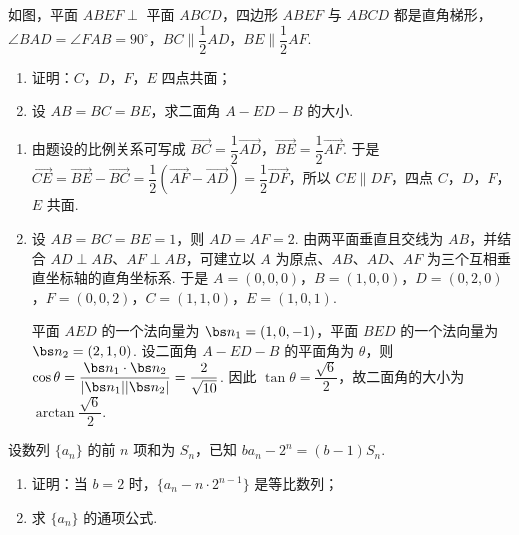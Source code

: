 \begin{problem}
如图，平面 \(ABEF\perp\) 平面 \(ABCD\)，四边形 \(ABEF\) 与 \(ABCD\) 都是直角梯形，\(\angle BAD=\angle FAB=90^{\circ}\)，\(BC\parallel\dfrac12AD\)，\(BE\parallel\dfrac12AF\).

\begin{enumerate}
\item 证明：\(C\)，\(D\)，\(F\)，\(E\) 四点共面；
\item 设 \(AB=BC=BE\)，求二面角 \(A-ED-B\) 的大小.
\end{enumerate}

\begin{center}
\end{center}
\end{problem}

\begin{solution}
\begin{enumerate}
\item 由题设的比例关系可写成 \(\overrightarrow{BC}=\dfrac12\overrightarrow{AD}\)，\(\overrightarrow{BE}=\dfrac12\overrightarrow{AF}\). 于是 \(\overrightarrow{CE}=\overrightarrow{BE}-\overrightarrow{BC}=\dfrac12(\overrightarrow{AF}-\overrightarrow{AD})=\dfrac12\overrightarrow{DF}\)，所以 \(CE\parallel DF\)，四点 \(C\)，\(D\)，\(F\)，\(E\) 共面.
\item 设 \(AB=BC=BE=1\)，则 \(AD=AF=2\). 由两平面垂直且交线为 \(AB\)，并结合 \(AD\perp AB\)、\(AF\perp AB\)，可建立以 \(A\) 为原点、\(AB\)、\(AD\)、\(AF\) 为三个互相垂直坐标轴的直角坐标系. 于是 \(A=(0,0,0)\)，\(B=(1,0,0)\)，\(D=(0,2,0)\)，\(F=(0,0,2)\)，\(C=(1,1,0)\)，\(E=(1,0,1)\).

平面 \(AED\) 的一个法向量为 \(\bs n_1=(1,0,-1)\)，平面 \(BED\) 的一个法向量为 \(\bs n_2=(2,1,0)\). 设二面角 \(A-ED-B\) 的平面角为 \(\theta\)，则 \(\cos\theta=\dfrac{\bs n_1\cdot\bs n_2}{\lvert\bs n_1\rvert\lvert\bs n_2\rvert}=\dfrac{2}{\sqrt{10}}\). 因此 \(\tan\theta=\dfrac{\sqrt6}{2}\)，故二面角的大小为 \(\arctan\dfrac{\sqrt6}{2}\).
\end{enumerate}
\end{solution}

\begin{problem}
设数列 \(\{a_n\}\) 的前 \(n\) 项和为 \(S_n\)，已知 \(ba_n-2^n=(b-1)S_n\).

\begin{enumerate}
\item 证明：当 \(b=2\) 时，\(\{a_n-n\cdot2^{n-1}\}\) 是等比数列；
\item 求 \(\{a_n\}\) 的通项公式.
\end{enumerate}
\end{problem}

